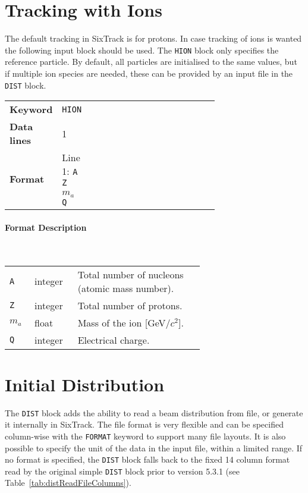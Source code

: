 \section{Tracking with Ions} \label{hions}

The default tracking in SixTrack is for protons.
In case tracking of ions is wanted the following input block should be used.
The \texttt{HION} block only specifies the reference particle.
By default, all particles are initialised to the same values, but if multiple ion species are needed, these can be provided by an input file in the \texttt{DIST} block.

\bigskip
\begin{tabular}{@{}llp{0.7\linewidth}}
    \textbf{Keyword}    & \texttt{HION}\index{HION} \\
    \textbf{Data lines} & 1 \\
    \textbf{Format}     & Line 1: \texttt{A Z $m_a$ Q}
\end{tabular}

\paragraph{Format Description}~

\bigskip
\begin{longtabu}{@{}llp{0.65\linewidth}}
    \texttt{A}     & integer & Total number of nucleons (atomic mass number). \\
    \texttt{Z}     & integer & Total number of protons. \\
    \texttt{$m_a$} & float   & Mass of the ion [GeV/$c^2$]. \\
    \texttt{Q}     & integer & Electrical charge.
\end{longtabu}

\section{Initial Distribution} \label{distBlock}

The \texttt{DIST} block adds the ability to read a beam distribution from file, or generate it internally in SixTrack.
The file format is very flexible and can be specified column-wise with the \texttt{FORMAT} keyword to support many file layouts.
It is also possible to specify the unit of the data in the input file, within a limited range.
If no format is specified, the \texttt{DIST} block falls back to the fixed 14 column format read by the original simple \texttt{DIST} block prior to version 5.3.1 (see Table~\ref{tab:distReadFileColumns}).

